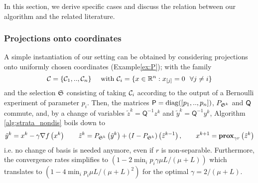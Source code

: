 In this section, we derive specific cases and discuss the relation between our algorithm and the related literature.
 

\subsubsection{Projections onto coordinates} \label{sec:coordproj}

A simple instantiation of our setting can be obtained by considering projections onto uniformly chosen coordinates (Example\;\ref{ex:P}); with 
the family 
$$ \mathcal{C} = \{\mathcal{C}_1,..,\mathcal{C}_n\} \quad\text{ with } \mathcal{C}_i = \{x\in\mathbb{R}^n  : x_{[j]} = 0 ~~ \forall j \neq i \} $$ 
and the selection $\mathfrak{S}$ consisting {of} taking $\mathcal{C}_i$ according to the output of a Bernoulli experiment of parameter $p_i$. Then, the matrices ${\mathsf{P}} = \operatorname{diag}( [p_1,..,p_n])$, $P_{\mathfrak{S}^k}$ and ${\mathsf{Q}}$ commute, {and, by a change of variables $\tilde{z}^k = \mathsf{Q}^{-1} z^k$ and $\tilde{y}^k  = \mathsf{Q}^{-1} y^k$, } Algorithm \ref{alg:strata_nondis} boils down to
{
\[
\tilde{y}^k = x^k - \gamma\nabla f\left(x^k\right)\qquad
\tilde{z}^{k} =  P_{\mathfrak{S}^k}\left(\tilde{y}^k\right) + (I- P_{\mathfrak{S}^k})\left(\tilde{z}^{k-1}\right),\qquad
x^{k+1}  = \mathbf{prox}_{\gamma r} \left(\tilde{z}^{k}\right)
 \]}
i.e. no change of basis is needed anymore, even if $r$ is non-separable. Furthermore, the convergence rates simplifies to $(1- 2 \min_i p_i  \gamma \mu L/(\mu + L))$ which translates to $(1- 4 \min_i p_i\mu L/(\mu + L)^2)$ for the optimal $\gamma = 2/(\mu+L)$.

